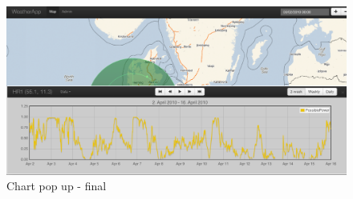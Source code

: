 \begin{figure}[htbp]
   \centering
   \includegraphics[width=1\linewidth]{figure/design_chart_final.eps}
   \caption{Chart pop up - final}
   \label{fig:chart_final}
\end{figure}
